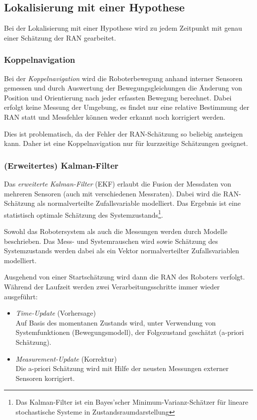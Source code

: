 		\subsection{Lokalisierung mit einer Hypothese}
			Bei der Lokalisierung mit einer Hypothese wird zu jedem Zeitpunkt mit genau einer Schätzung der RAN gearbeitet.

			\subsubsection{Koppelnavigation}
				Bei der \emph{Koppelnavigation} wird die Roboterbewegung anhand interner Sensoren gemessen und durch Auswertung der Bewegungsgleichungen die Änderung von Position und Orientierung nach jeder erfassten Bewegung berechnet. Dabei erfolgt keine Messung der Umgebung, \dh es findet nur eine relative Bestimmung der RAN statt und Messfehler können weder erkannt noch korrigiert werden.
				
				Dies ist problematisch, da der Fehler der RAN-Schätzung so beliebig ansteigen kann. Daher ist eine Koppelnavigation nur für kurzzeitige Schätzungen geeignet.

			\subsubsection{(Erweitertes) Kalman-Filter}
				Das \emph{erweiterte Kalman-Filter} (EKF) erlaubt die Fusion der Messdaten von mehreren Sensoren (auch mit verschiedenen Messraten). Dabei wird die RAN-Schätzung als normalverteilte Zufallsvariable modelliert. Das Ergebnis ist eine statistisch optimale Schätzung des Systemzustands\footnote{Das Kalman-Filter ist ein Bayes'scher Minimum-Varianz-Schätzer für lineare stochastische Systeme in Zustandsraumdarstellung}.
				
				Sowohl das Robotersystem als auch die Messungen werden durch Modelle beschrieben. Das Mess- und Systemrauschen wird sowie Schätzung des Systemzustands werden dabei als ein Vektor normalverteilter Zufallsvariablen modelliert.
				
				Ausgehend von einer Startschätzung wird dann die RAN des Roboters verfolgt. Während der Laufzeit werden zwei Verarbeitungsschritte immer wieder ausgeführt:
				\begin{itemize}
					\item \emph{Time-Update} (Vorhersage) \\ Auf Basis des momentanen Zustands wird, unter Verwendung von Systemfunktionen (Bewegungsmodell), der Folgezustand geschätzt (a-priori Schätzung).
					\item \emph{Measurement-Update} (Korrektur) \\ Die a-priori Schätzung wird mit Hilfe der neusten Messungen externer Sensoren korrigiert.
				\end{itemize}
			
